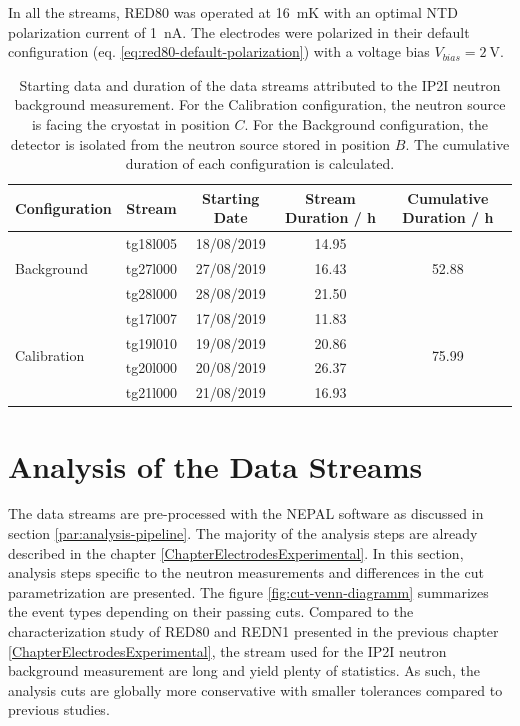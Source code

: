 In all the streams, RED80 was operated at \SI{16}{\milli\kelvin} with an optimal NTD polarization current of \SI{1}{\nano\ampere}. The electrodes were polarized in their default configuration (eq. \ref{eq:red80-default-polarization}) with a voltage bias $V_{bias} = \SI{2}{\volt}$.

\begin{table}[]
\centering
\begin{tabular}{l|c|c|c|c}
Configuration                & Stream   & Starting Date & Stream Duration / \si{ \hour} & Cumulative Duration / \si{ \hour}  \\ \hline \hline
\multirow{3}{*}{Background}  & tg18l005 & 18/08/2019  & 14.95 & \multirow{3}{*}{52.88}\\
                             & tg27l000 & 27/08/2019 & 16.43 & \\
                             & tg28l000 & 28/08/2019 & 21.50 & \\ \hline
\multirow{4}{*}{Calibration} & tg17l007 & 17/08/2019 & 11.83 & \multirow{4}{*}{75.99} \\
                             & tg19l010 & 19/08/2019 & 20.86 &\\
                             & tg20l000 & 20/08/2019 & 26.37  & \\
                             & tg21l000 & 21/08/2019 & 16.93  &
\end{tabular}
\caption{Starting data and duration of the data streams attributed to the IP2I neutron background measurement. For the Calibration configuration, the neutron source is facing the cryostat in position $C$. For the Background configuration, the detector is isolated from the neutron source stored in position $B$. The cumulative duration of each configuration is calculated.}
\label{tab:neutron-streams}
\end{table}


\section{Analysis of the Data Streams}
\label{par:analysis-data-streams}

The data streams are pre-processed with the NEPAL software as discussed in section \ref{par:analysis-pipeline}. The majority of the analysis steps are already described in the chapter \ref{ChapterElectrodesExperimental}. 
In this section, analysis steps specific to the neutron measurements and differences in the cut parametrization are presented. The figure \ref{fig:cut-venn-diagramm} summarizes the event types depending on their passing cuts.
Compared to the characterization study of RED80 and REDN1 presented in the previous chapter \ref{ChapterElectrodesExperimental}, the stream used for the IP2I neutron background measurement are long and yield plenty of statistics. As such, the analysis cuts are globally more conservative with smaller tolerances compared to previous studies. 

